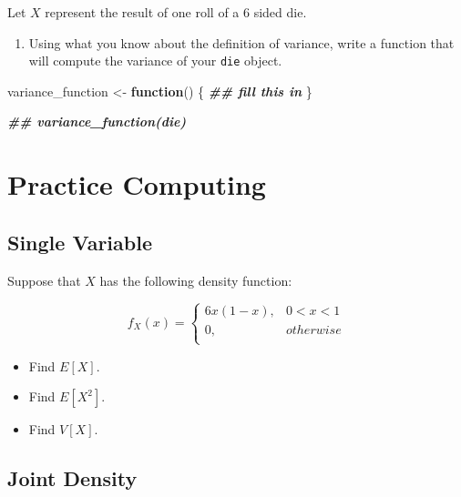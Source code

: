 \documentclass[
]{book}
\newenvironment{Shaded}{\begin{snugshade}}{\end{snugshade}}
\newcommand{\ControlFlowTok}[1]{\textcolor[rgb]{0.13,0.29,0.53}{\textbf{#1}}}
\newcommand{\DocumentationTok}[1]{\textcolor[rgb]{0.56,0.35,0.01}{\textbf{\textit{#1}}}}
\newcommand{\NormalTok}[1]{#1}
\newcommand{\OtherTok}[1]{\textcolor[rgb]{0.56,0.35,0.01}{#1}}
\providecommand{\tightlist}{%
  \setlength{\itemsep}{0pt}\setlength{\parskip}{0pt}}
\theoremstyle{definition}
\theoremstyle{definition}
\theoremstyle{definition}
\theoremstyle{definition}
\theoremstyle{remark}
\begin{document}
Let \(X\) represent the result of one roll of a 6 sided die.

\begin{enumerate}
\def\labelenumi{\arabic{enumi}.}
\setcounter{enumi}{4}
\tightlist
\item
  Using what you know about the definition of variance, write a function that will compute the variance of your \texttt{die} object.
\end{enumerate}

\begin{Shaded}
\begin{Highlighting}[]
\NormalTok{variance\_function }\OtherTok{\textless{}{-}} \ControlFlowTok{function}\NormalTok{() \{ }
  \DocumentationTok{\#\# fill this in}
\NormalTok{\}}

\DocumentationTok{\#\# variance\_function(die)}
\end{Highlighting}
\end{Shaded}

\hypertarget{practice-computing}{%
\section{Practice Computing}\label{practice-computing}}

\hypertarget{single-variable}{%
\subsection{Single Variable}\label{single-variable}}

Suppose that \(X\) has the following density function:

\[ 
  f_{X}(x) = \begin{cases} 
    6x(1 - x), & 0 < x < 1 \\ 
    0, & otherwise \\ 
  \end{cases}
\]

\begin{itemize}
\tightlist
\item
  Find \(E[X]\).
\item
  Find \(E[X^2]\).
\item
  Find \(V[X]\).
\end{itemize}

\hypertarget{joint-density-1}{%
\subsection{Joint Density}\label{joint-density-1}}
\end{document}
